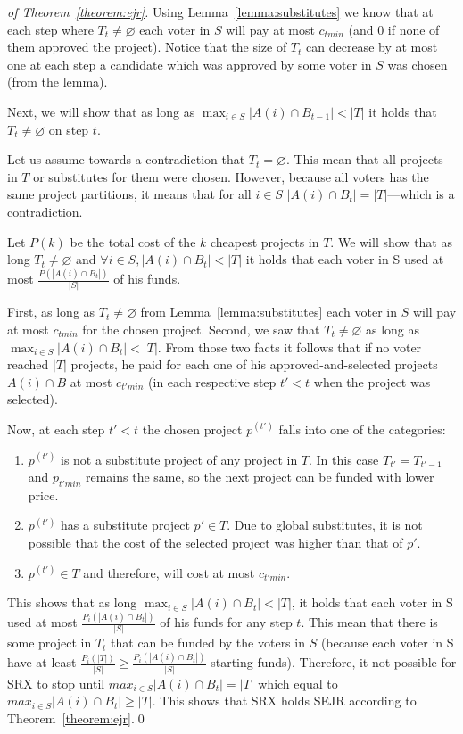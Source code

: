 \documentclass[runningheads]{llncs}
\begin{document}
\begin{proof}[ of Theorem~\ref{theorem:ejr}]
Using Lemma~\ref{lemma:substitutes} we know that at each step where $T_t\neq\varnothing$ each voter in $S$ will pay at most $c_{tmin}$ (and 0 if none of them approved the project). Notice that the size of $T_t$ can decrease by at most one at each step a candidate which was approved by some voter in $S$ was chosen (from the lemma). 

Next, we will show that as long as $\max_{i\in S}|A(i)\cap B_{t-1}|<|T|$ it holds that $T_t\neq\varnothing$ on step $t$. 

Let us assume towards a contradiction that $T_t=\varnothing$. This mean that all projects in $T$ or substitutes for them were chosen. However, because all voters has the same project partitions, it means that for all $i\in S$ $|A(i)\cap B_t|=|T|$---which is a contradiction.

Let  $P(k)$ be the total cost of the $k$ cheapest projects in $T$. We will show that as long $T_t\neq\varnothing$ and $\forall i\in S, |A(i)\cap B_t|<|T|$ it holds that each voter in S used at most $\frac{P(|A(i)\cap B_t|)}{|S|}$ of his funds.

First, as long as $T_t\neq\varnothing$ from  Lemma~\ref{lemma:substitutes} each voter in $S$ will pay at most $c_{tmin}$ for the chosen project. Second, we saw that $T_t\neq\varnothing$ as long as $\max_{i\in S}|A(i)\cap B_t|<|T|$. From those two facts it follows that if no voter reached $|T|$ projects, he paid for each one of his approved-and-selected projects $A(i)\cap B$ at most $c_{t'min}$ (in each respective step $t'<t$ when the project was selected).

Now, at each step $t'<t$ the chosen project $p^{(t')}$ falls into one of the categories:
 
\begin{enumerate}
    \item $p^{(t')}$ is not a substitute project of any project in $T$. In this case $T_{t'}=T_{t'-1}$ and $p_{t'min}$ remains the same, so the next project can be funded with lower price.
    
    \item $p^{(t')}$ has a substitute  project $p'\in T$. Due to  global substitutes, it is not possible that the cost of the selected project was higher than that of $p'$.
    
    \item $p^{(t')} \in T$ and therefore, will cost at most $c_{t'min}$.
\end{enumerate}

This shows that as long $\max_{i\in S}|A(i)\cap B_t|<|T|$, it holds that each voter in S used at most $\frac{P_i(|A(i)\cap B_t|)}{|S|}$ of his funds for any step $t$.  This mean that there is some project in $T_t$ that can be funded by the voters in $S$ (because each voter in S have at least $\frac{P_i(|T|)}{|S|} \geq \frac{P_i(|A(i)\cap B_t|)}{|S|}$ starting funds). Therefore, it not possible for SRX to stop until $max_{i\in S}|A(i)\cap B_t|=|T|$ which equal to $max_{i\in S}|A(i)\cap B_t|\geq|T|$. This shows that SRX holds SEJR according to Theorem~\ref{theorem:ejr}.\qed
\end{proof}
\end{document}
